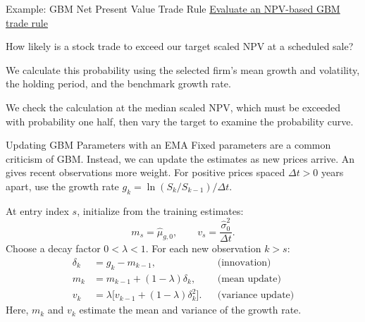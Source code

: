 \documentclass[aspectratio=169,11pt]{beamer}
\begin{document}
\begin{frame}{Example: GBM Net Present Value Trade Rule}
\textbf{}
\href{https://github.com/varnerlab/CHEME-5660-CourseRepository-Fall-2026/blob/main/lectures/week-5/L5a/CHEME-5660-L5a-Example-GBM-NPV-TradeRule-Fall-2026.ipynb}{Evaluate an NPV-based GBM trade rule}

\vspace{0.8em}
How likely is a stock trade to exceed our target scaled NPV at a scheduled sale?

\vspace{0.6em}
We calculate this probability using the selected firm's mean growth and
volatility, the holding period, and the benchmark growth rate.

\vspace{0.6em}
We check the calculation at the median scaled NPV, which must be exceeded
with probability one half, then vary the target to examine the probability curve.
\end{frame}

\begin{frame}{Updating GBM Parameters with an EMA}
Fixed parameters are a common criticism of GBM. Instead, we can update the
estimates as new prices arrive. An 
gives recent observations more weight. For positive prices spaced $\Delta t>0$
years apart, use the growth rate $g_k=\ln(S_k/S_{k-1})/\Delta t$.

\vspace{0.3em}
At entry index $s$, initialize from the training estimates:
\[
  m_s=\hat\mu_{g,0},\qquad v_s=\frac{\hat\sigma_0^2}{\Delta t}.
\]
Choose a decay factor $0<\lambda<1$. For each new observation $k>s$:
\[
\begin{aligned}
  \delta_k &= g_k-m_{k-1}, &&\text{(innovation)}\\
  m_k &= m_{k-1}+(1-\lambda)\delta_k, &&\text{(mean update)}\\
  v_k &= \lambda\bigl[v_{k-1}+(1-\lambda)\delta_k^2\bigr]. &&\text{(variance update)}
\end{aligned}
\]
Here, $m_k$ and $v_k$ estimate the mean and variance of the growth rate.
\end{frame}
\end{document}

